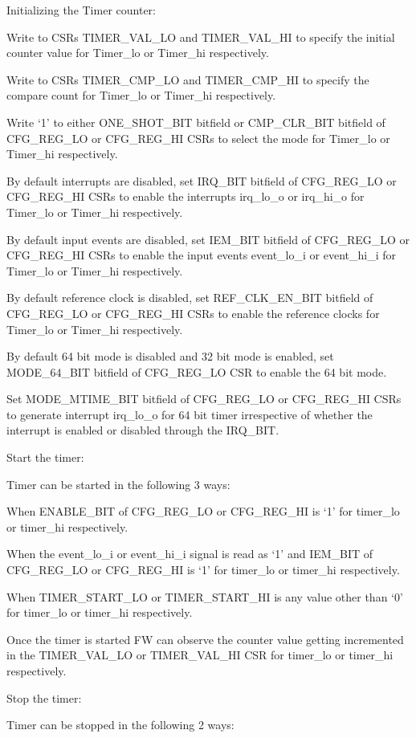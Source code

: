 Initializing the Timer counter:

    Write to CSRs TIMER_VAL_LO and TIMER_VAL_HI to specify the initial counter value for Timer_lo or Timer_hi respectively.

    Write to CSRs TIMER_CMP_LO and TIMER_CMP_HI to specify the compare count for Timer_lo or Timer_hi respectively.

    Write ‘1’ to either ONE_SHOT_BIT bitfield or CMP_CLR_BIT bitfield of CFG_REG_LO or CFG_REG_HI CSRs to select the mode for Timer_lo or Timer_hi respectively.

    By default interrupts are disabled, set IRQ_BIT bitfield of CFG_REG_LO or CFG_REG_HI CSRs to enable the interrupts irq_lo_o or irq_hi_o for Timer_lo or Timer_hi respectively.

    By default input events are disabled, set IEM_BIT bitfield of CFG_REG_LO or CFG_REG_HI CSRs to enable the input events event_lo_i or event_hi_i for Timer_lo or Timer_hi respectively.

    By default reference clock is disabled, set REF_CLK_EN_BIT bitfield of CFG_REG_LO or CFG_REG_HI CSRs to enable the reference clocks for Timer_lo or Timer_hi respectively.

    By default 64 bit mode is disabled and 32 bit mode is enabled, set MODE_64_BIT bitfield of CFG_REG_LO CSR to enable the 64 bit mode.

    Set MODE_MTIME_BIT bitfield of CFG_REG_LO or CFG_REG_HI CSRs to generate interrupt irq_lo_o for 64 bit timer irrespective of whether the interrupt is enabled or disabled through the IRQ_BIT.

Start the timer:

    Timer can be started in the following 3 ways:

            When ENABLE_BIT of CFG_REG_LO or CFG_REG_HI is ‘1’ for timer_lo or timer_hi respectively.

            When the event_lo_i or event_hi_i signal is read as ‘1’ and IEM_BIT of CFG_REG_LO or CFG_REG_HI is ‘1’ for timer_lo or timer_hi respectively.

            When TIMER_START_LO or TIMER_START_HI is any value other than ‘0’ for timer_lo or timer_hi respectively.

    Once the timer is started FW can observe the counter value getting incremented in the TIMER_VAL_LO or TIMER_VAL_HI CSR for timer_lo or timer_hi respectively.

Stop the timer:

    Timer can be stopped in the following 2 ways:

